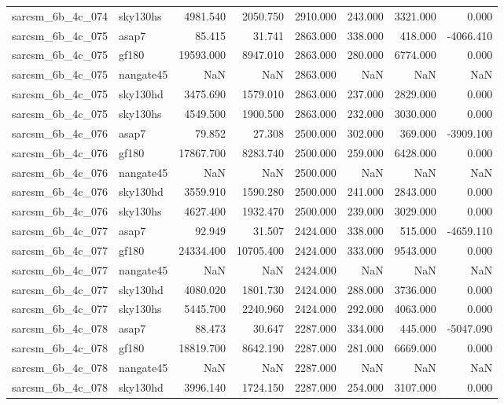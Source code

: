 \begin{tabular}{llrrrrrr}
sarcsm\_6b\_4c\_074 & sky130hs & 4981.540 & 2050.750 & 2910.000 & 243.000 & 3321.000 & 0.000 \\
sarcsm\_6b\_4c\_075 & asap7 & 85.415 & 31.741 & 2863.000 & 338.000 & 418.000 & -4066.410 \\
sarcsm\_6b\_4c\_075 & gf180 & 19593.000 & 8947.010 & 2863.000 & 280.000 & 6774.000 & 0.000 \\
sarcsm\_6b\_4c\_075 & nangate45 & NaN & NaN & 2863.000 & NaN & NaN & NaN \\
sarcsm\_6b\_4c\_075 & sky130hd & 3475.690 & 1579.010 & 2863.000 & 237.000 & 2829.000 & 0.000 \\
sarcsm\_6b\_4c\_075 & sky130hs & 4549.500 & 1900.500 & 2863.000 & 232.000 & 3030.000 & 0.000 \\
sarcsm\_6b\_4c\_076 & asap7 & 79.852 & 27.308 & 2500.000 & 302.000 & 369.000 & -3909.100 \\
sarcsm\_6b\_4c\_076 & gf180 & 17867.700 & 8283.740 & 2500.000 & 259.000 & 6428.000 & 0.000 \\
sarcsm\_6b\_4c\_076 & nangate45 & NaN & NaN & 2500.000 & NaN & NaN & NaN \\
sarcsm\_6b\_4c\_076 & sky130hd & 3559.910 & 1590.280 & 2500.000 & 241.000 & 2843.000 & 0.000 \\
sarcsm\_6b\_4c\_076 & sky130hs & 4627.400 & 1932.470 & 2500.000 & 239.000 & 3029.000 & 0.000 \\
sarcsm\_6b\_4c\_077 & asap7 & 92.949 & 31.507 & 2424.000 & 338.000 & 515.000 & -4659.110 \\
sarcsm\_6b\_4c\_077 & gf180 & 24334.400 & 10705.400 & 2424.000 & 333.000 & 9543.000 & 0.000 \\
sarcsm\_6b\_4c\_077 & nangate45 & NaN & NaN & 2424.000 & NaN & NaN & NaN \\
sarcsm\_6b\_4c\_077 & sky130hd & 4080.020 & 1801.730 & 2424.000 & 288.000 & 3736.000 & 0.000 \\
sarcsm\_6b\_4c\_077 & sky130hs & 5445.700 & 2240.960 & 2424.000 & 292.000 & 4063.000 & 0.000 \\
sarcsm\_6b\_4c\_078 & asap7 & 88.473 & 30.647 & 2287.000 & 334.000 & 445.000 & -5047.090 \\
sarcsm\_6b\_4c\_078 & gf180 & 18819.700 & 8642.190 & 2287.000 & 281.000 & 6669.000 & 0.000 \\
sarcsm\_6b\_4c\_078 & nangate45 & NaN & NaN & 2287.000 & NaN & NaN & NaN \\
sarcsm\_6b\_4c\_078 & sky130hd & 3996.140 & 1724.150 & 2287.000 & 254.000 & 3107.000 & 0.000 \\

\end{tabular}
